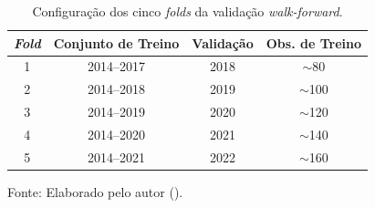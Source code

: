 \begin{table}[htbp]
    \centering
    \caption[Configuração dos \textit{folds} \textit{walk-forward}]{Configuração dos cinco \textit{folds} da validação \textit{walk-forward}.}
    \label{tab:folds}
    \begin{tabular}{cccc}
        \toprule
        \textbf{\textit{Fold}} & \textbf{Conjunto de Treino} & \textbf{Validação} & \textbf{Obs. de Treino} \\
        \midrule
        1 & 2014--2017 & 2018 & $\sim$80 \\
        2 & 2014--2018 & 2019 & $\sim$100 \\
        3 & 2014--2019 & 2020 & $\sim$120 \\
        4 & 2014--2020 & 2021 & $\sim$140 \\
        5 & 2014--2021 & 2022 & $\sim$160 \\
        \bottomrule
    \end{tabular}

    \vspace{2pt}
    {\small Fonte: Elaborado pelo autor (\the\year).}
\end{table}
